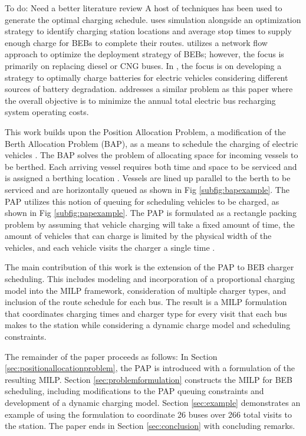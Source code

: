\documentclass[utf8]{FrontiersinHarvard}
\let\cite\citep                                                                 %
\newcommand{\TODO}[1]{{\color{green} To do: #1}}                                %
\newcommand{\A}{26 }                                                            %
\newcommand{\N}{266 }                                                           %
\begin{document}
\TODO{Need a better literature review} A host of techniques has been used to generate the optimal charging schedule.
\cite{Sebastiani2016} uses simulation alongside an optimization strategy to identify charging station locations and
average stop times to supply enough charge for BEBs to complete their routes. \cite{Wei2018} utilizes a network flow
approach to optimize the deployment strategy of BEBs; however, the focus is primarily on replacing diesel or CNG buses.
In \cite{Hoke2014}, the focus is on developing a strategy to optimally charge batteries for electric vehicles
considering different sources of battery degradation. \cite{Wang2017} addresses a similar problem as this paper where
the overall objective is to minimize the annual total electric bus recharging system operating costs.

This work builds upon the Position Allocation Problem, a modification of the Berth Allocation Problem (BAP), as a means
to schedule the charging of electric vehicles \cite{Qarebagh2019}. The BAP solves the problem of allocating space for
incoming vessels to be berthed. Each arriving vessel requires both time and space to be serviced and is assigned a
berthing location \cite{Imai2001}. Vessels are lined up parallel to the berth to be serviced and are horizontally
queued as shown in Fig \ref{subfig:bapexample}. The PAP utilizes this notion of queuing for scheduling vehicles to be
charged, as shown in Fig \ref{subfig:papexample}. The PAP is formulated as a rectangle packing problem by assuming that
vehicle charging will take a fixed amount of time, the amount of vehicles that can charge is limited by the physical
width of the vehicles, and each vehicle visits the charger a single time \cite{Qarebagh2019}.

The main contribution of this work is the extension of the PAP to BEB charger scheduling. This includes modeling and
incorporation of a proportional charging model into the MILP framework, consideration of multiple charger types, and
inclusion of the route schedule for each bus. The result is a MILP formulation that coordinates charging times and
charger type for every visit that each bus makes to the station while considering a dynamic charge model and scheduling
constraints.

The remainder of the paper proceeds as follows: In Section \ref{sec:positionallocationproblem}, the PAP is introduced
with a formulation of the resulting MILP. Section \ref{sec:problemformulation} constructs the MILP for BEB scheduling,
including modifications to the PAP queuing constraints and development of a dynamic charging model. Section
\ref{sec:example} demonstrates an example of using the formulation to coordinate \A buses over \N total visits to the
  station. The paper ends in Section \ref{sec:conclusion} with concluding remarks.
\end{document}
